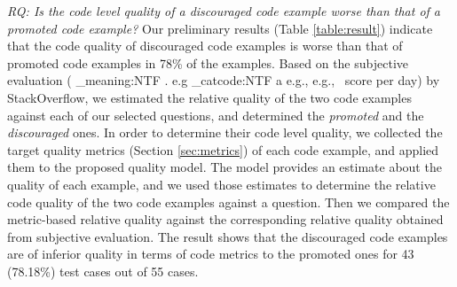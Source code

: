\documentclass[conference]{IEEEtran}
\makeatletter
\newcommand\latinabbrev[1]{
  \peek_meaning:NTF . {%
    #1\@}%
  { \peek_catcode:NTF a {%
      #1., \@ }%
    {#1., \@}}}
\def\eg{\latinabbrev{e.g}}
\makeatother
\begin{document}
\begin{table}
\centering
\caption{Metrics Correlation}\label{table:correlation}
\vspace{-.5cm}
\end{table}

\emph{RQ: Is the code level quality of a discouraged code example worse than that of a promoted code example?} Our preliminary results (Table \ref{table:result}) indicate that the code quality of discouraged code examples is worse than that of promoted code examples in 78\% of the examples. Based on the subjective evaluation (\eg\ score per day) by StackOverflow, we estimated the relative quality of the two code examples against each of our selected questions, and determined the \emph{promoted} and the \emph{discouraged} ones. In order to determine their code level quality, we collected the target quality metrics (Section \ref{sec:metrics}) of each code example, and applied them to the proposed quality model. The model provides an estimate about the quality of each example, and we used those estimates to determine the relative code quality of the two code examples against a question. Then we compared the metric-based relative quality against the corresponding relative quality obtained from subjective evaluation. The result shows that the discouraged code examples are of inferior quality in terms of code metrics to the promoted ones for 43 (78.18\%) test cases out of 55 cases.
\end{document}
